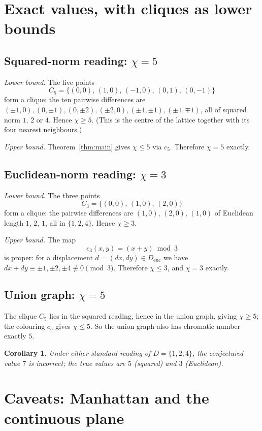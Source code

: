 \documentclass[11pt]{article}
\newtheorem{corollary}[theorem]{Corollary}
\theoremstyle{definition}
\theoremstyle{remark}
\newcommand{\chiG}{\chi}
\begin{document}
\section{Exact values, with cliques as lower bounds}

\subsection*{Squared-norm reading: $\chiG = 5$}

\emph{Lower bound.} The five points
\[
  C_5 = \{(0,0),\,(1,0),\,(-1,0),\,(0,1),\,(0,-1)\}
\]
form a clique: the ten pairwise differences are
$(\pm1,0),(0,\pm1),(0,\pm2),(\pm2,0),(\pm1,\pm1),(\pm1,\mp1)$, all of squared
norm $1$, $2$ or $4$. Hence $\chiG \ge 5$. (This is the centre of the lattice
together with its four nearest neighbours.)

\emph{Upper bound.} Theorem~\ref{thm:main} gives $\chiG \le 5$ via $c_5$.
Therefore $\chiG = 5$ exactly.

\subsection*{Euclidean-norm reading: $\chiG = 3$}

\emph{Lower bound.} The three points
\[
  C_3 = \{(0,0),\,(1,0),\,(2,0)\}
\]
form a clique: the pairwise differences are $(1,0)$, $(2,0)$, $(1,0)$ of
Euclidean length $1$, $2$, $1$, all in $\{1,2,4\}$. Hence $\chiG \ge 3$.

\emph{Upper bound.} The map
\[
  c_3(x,y) = (x+y) \bmod 3
\]
is proper: for a displacement $d=(dx,dy) \in D_{\mathrm{euc}}$ we have
$dx+dy \equiv \pm1,\pm2,\pm4 \not\equiv 0 \pmod 3$. Therefore $\chiG \le 3$, and
$\chiG = 3$ exactly.

\subsection*{Union graph: $\chiG = 5$}

The clique $C_5$ lies in the squared reading, hence in the union graph, giving
$\chiG \ge 5$; the colouring $c_5$ gives $\chiG \le 5$. So the union graph also
has chromatic number exactly $5$.

\begin{corollary}
Under either standard reading of $D=\{1,2,4\}$, the conjectured value $7$ is
incorrect; the true values are $5$ (squared) and $3$ (Euclidean).
\end{corollary}

\section{Caveats: Manhattan and the continuous plane}
\end{document}
